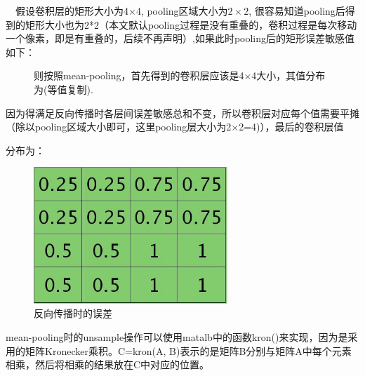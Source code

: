 　假设卷积层的矩形大小为4×4, pooling区域大小为$2×2$, 很容易知道pooling后得到的矩形大小也为2*2（本文默认pooling过程是没有重叠的，卷积过程是每次移动一个像素，即是有重叠的，后续不再声明）,如果此时pooling后的矩形误差敏感值如下：
　
\begin{figure}[!htp]
\centering
{}
\;
\caption{则按照mean-pooling，首先得到的卷积层应该是4×4大小，其值分布为(等值复制).}
\end{figure}

因为得满足反向传播时各层间误差敏感总和不变，所以卷积层对应每个值需要平摊（除以pooling区域大小即可，这里pooling层大小为2×2=4)），最后的卷积层值

分布为：

\begin{figure}[!hbtp]
\centering
\includegraphics[width=0.65\textwidth]{DLTips/BP4.jpg}
\caption{反向传播时的误差}
\end{figure}

mean-pooling时的unsample操作可以使用matalb中的函数kron()来实现，因为是采用的矩阵Kronecker乘积。C=kron(A, B)表示的是矩阵B分别与矩阵A中每个元素相乘，然后将相乘的结果放在C中对应的位置。

